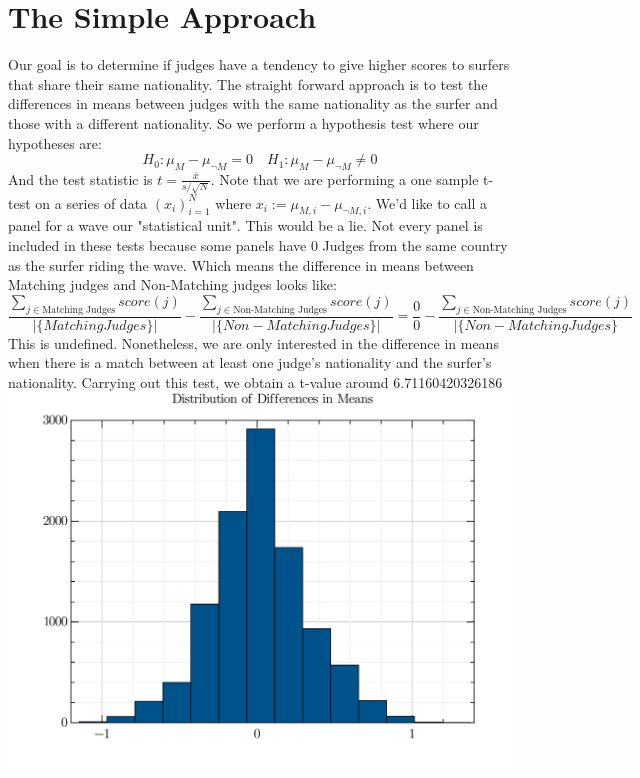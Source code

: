 \documentclass{article}
\theoremstyle{definition}
\begin{document}
\section{The Simple Approach}
Our goal is to determine if judges have a tendency to give higher scores to surfers that share their same nationality.
The straight forward approach is to test the differences in means between judges with the same nationality as the surfer and those with a different nationality. So we perform a hypothesis test where our hypotheses are:
\[ H_0: \mu_M  - \mu_{\neg M} = 0  \quad H_1: \mu_M -\mu_{\neg M} \neq 0 \]
And the test statistic is $ t = \frac{\bar{x}}{s/\sqrt{N}} $. Note that we are performing a one sample t-test on a series of data $(x_i)_{i=1}^N$ where $x_i := \mu_{M,i}  - \mu_{\neg M,i}$.  We'd like to call a panel for a wave our "statistical unit". This would be a lie. Not every panel is included in these tests because some panels have 0 Judges from the same country as the surfer riding the wave. Which means the difference in means between Matching judges and Non-Matching judges looks like:
\[\frac{\sum_{j \in \text{Matching Judges}} score(j) }{|\{Matching Judges\}|} - \frac{\sum_{j \in\text{Non-Matching Judges}} score(j) }{|\{Non-Matching Judges\}|} = \frac{0}{0} - \frac{\sum_{j \in\text{Non-Matching Judges}} score(j) }{|\{Non-Matching Judges\}} \]
This is undefined. Nonetheless, we are only interested in the difference in means when there is a match between at least one judge's nationality and the surfer's nationality. Carrying out this test, we obtain a t-value around 6.71160420326186
\includegraphics[width=\textwidth]{./src/visuals/DistOfDiffInMeans.png}
\end{document}
